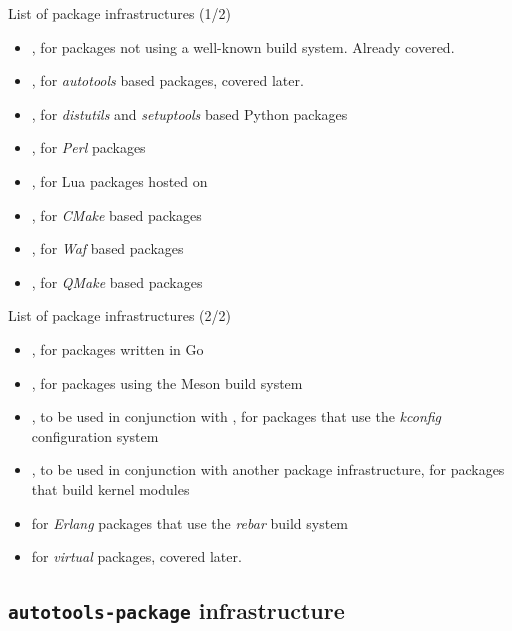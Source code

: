 \begin{frame}{List of package infrastructures (1/2)}
  \begin{itemize}
  \item {}, for packages not using a well-known
    build system. Already covered.
  \item {}, for {\em autotools} based packages,
    covered later.
  \item {}, for {\em distutils} and {\em
      setuptools} based Python packages
  \item {}, for {\em Perl} packages
  \item {}, for Lua packages hosted on
  \item {}, for {\em CMake} based packages
  \item {}, for {\em Waf} based packages
  \item {}, for {\em QMake} based packages
  \end{itemize}
\end{frame}

\begin{frame}{List of package infrastructures (2/2)}
  \begin{itemize}
  \item {}, for packages written in Go
  \item {}, for packages using the Meson build
    system
  \item {}, to be used in conjunction with
    , for packages that use the {\em kconfig}
    configuration system
  \item {}, to be used in conjunction with
    another package infrastructure, for packages that build kernel
    modules
  \item {} for {\em Erlang} packages that use the
    {\em rebar} build system
  \item {} for {\em virtual} packages, covered
    later.
  \end{itemize}
\end{frame}

\subsection{{\tt autotools-package} infrastructure}

